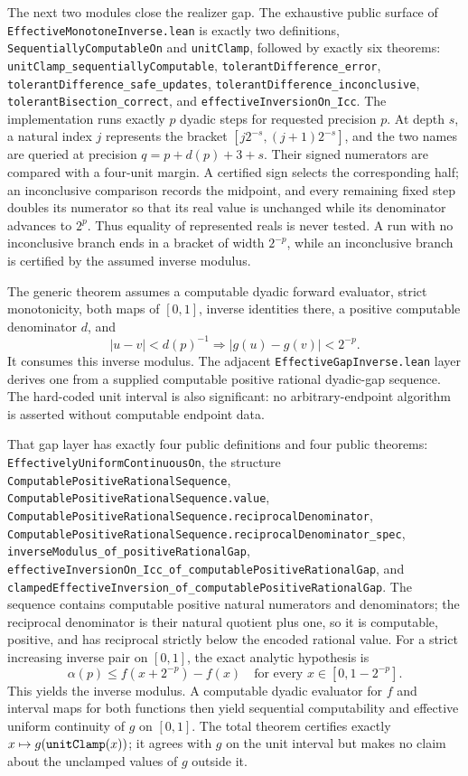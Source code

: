 \documentclass[11pt,oneside]{article}
\theoremstyle{definition}
\theoremstyle{remark}
\begin{document}
The next two modules close the realizer gap.  The exhaustive public surface of
\nolinkurl{EffectiveMonotoneInverse.lean} is exactly two definitions,
\nolinkurl{SequentiallyComputableOn} and \nolinkurl{unitClamp}, followed by
exactly six theorems:
\nolinkurl{unitClamp_sequentiallyComputable},
\nolinkurl{tolerantDifference_error},
\nolinkurl{tolerantDifference_safe_updates},
\nolinkurl{tolerantDifference_inconclusive},
\nolinkurl{tolerantBisection_correct}, and
\nolinkurl{effectiveInversionOn_Icc}.  The implementation runs exactly \(p\)
dyadic steps for requested precision \(p\).  At depth \(s\), a natural index
\(j\) represents the bracket
\([j2^{-s},(j+1)2^{-s}]\), and the two names are queried at precision
\(q=p+d(p)+3+s\).  Their signed numerators are compared with a four-unit
margin.  A certified sign selects the corresponding half; an inconclusive
comparison records the midpoint, and every remaining fixed step doubles its
numerator so that its real value is unchanged while its denominator advances
to \(2^p\).  Thus equality of represented reals is never tested.  A run with
no inconclusive branch ends in a bracket of width \(2^{-p}\), while an
inconclusive branch is certified by the assumed inverse modulus.

The generic theorem assumes a computable dyadic forward evaluator, strict
monotonicity, both maps of \([0,1]\), inverse identities there, a positive
computable denominator \(d\), and
\[
 |u-v|<d(p)^{-1}\Longrightarrow |g(u)-g(v)|<2^{-p}.
\]
It consumes this inverse modulus.  The adjacent
\nolinkurl{EffectiveGapInverse.lean} layer derives one from a supplied
computable positive rational dyadic-gap sequence.  The hard-coded unit interval
is also significant: no arbitrary-endpoint algorithm is asserted without
computable endpoint data.

That gap layer has exactly four public definitions and four public theorems:
\nolinkurl{EffectivelyUniformContinuousOn}, the structure
\nolinkurl{ComputablePositiveRationalSequence},
\nolinkurl{ComputablePositiveRationalSequence.value},
\nolinkurl{ComputablePositiveRationalSequence.reciprocalDenominator},
\nolinkurl{ComputablePositiveRationalSequence.reciprocalDenominator_spec},
\nolinkurl{inverseModulus_of_positiveRationalGap},
\nolinkurl{effectiveInversionOn_Icc_of_computablePositiveRationalGap}, and
\nolinkurl{clampedEffectiveInversion_of_computablePositiveRationalGap}.
The sequence contains computable positive natural numerators and denominators;
the reciprocal denominator is their natural quotient plus one, so it is
computable, positive, and has reciprocal strictly below the encoded rational
value.  For a strict increasing inverse pair on \([0,1]\), the exact analytic
hypothesis is
\[
 \alpha(p)\le f(x+2^{-p})-f(x)
 \quad\text{for every }x\in[0,1-2^{-p}].
\]
This yields the inverse modulus.  A computable dyadic evaluator for \(f\) and
interval maps for both functions then yield sequential computability and
effective uniform continuity of \(g\) on \([0,1]\).  The total theorem certifies
exactly \(x\mapsto g(\text{\texttt{unitClamp}}(x))\); it agrees with \(g\) on the
unit interval but makes no claim about the unclamped values of \(g\) outside it.
\end{document}
